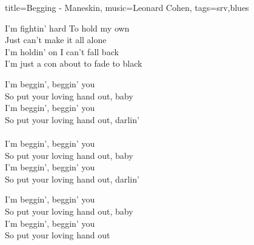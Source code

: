 \begin{song}{title={Begging - Maneskin}, music={Leonard Cohen}, tags={srv,blues}}
\begin{bridge}	
	I'm fightin' hard To hold my own \\
	Just can't make it all alone \\
	I'm holdin' on I can't fall back \\
	I'm just a con about to fade to black
\end{bridge}
\begin{chorus}
		I'm beggin', beggin' you \\
	So put your loving hand out, baby \\
	I'm beggin', beggin' you \\
	So put your loving hand out, darlin'\\ \\
		I'm beggin', beggin' you \\
	So put your loving hand out, baby \\
	I'm beggin', beggin' you \\
	So put your loving hand out, darlin'
\end{chorus}
\begin{outro}
	I'm beggin', beggin' you \\
	So put your loving hand out, baby \\
	I'm beggin', beggin' you \\
	So put your loving hand out
\end{outro}
\end{song}
